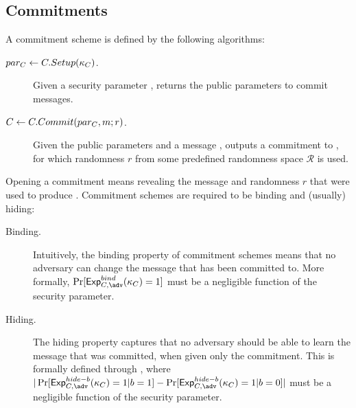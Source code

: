 \iffalse
\subsection{Commitments}
\label{sapp:commitments}

A commitment scheme is defined by the following algorithms:

\begin{description}
\item[$par_C \gets C.Setup(\kappa_{C})$.] Given a security parameter \Csecpar,
  returns the public parameters \Cparm to commit messages.
\item[$C \gets C.Commit(par_C,m;r)$.] Given the public parameters and
  a message \msg, outputs a commitment \Ccom to \msg, for which randomness $r$
  from some predefined randomness space $\mathcal{R}$ is used.
\end{description}

Opening a commitment \Ccom means revealing the message \msg and randomness $r$
that were used to produce \Ccom. Commitment schemes are required to be binding
and (usually) hiding:

\begin{description}
\item[Binding.] Intuitively, the binding property of commitment schemes means
  that no adversary can change the message that has been committed to. More
  formally, $\Pr[\ExpComBind(\Csecpar) = 1]$ must be a negligible function of
  the security parameter.
\item[Hiding.] The hiding property captures that no adversary should be able to
  learn the message that was committed, when given only the commitment. This is
  formally defined through \ExpComHideb, where $|\Pr[\ExpComHideb(\Csecpar)=1|
  b=1] - \Pr[\ExpComHideb(\Csecpar)=1|b=0]|$ must be a negligible function of
  the security parameter.
\end{description}

